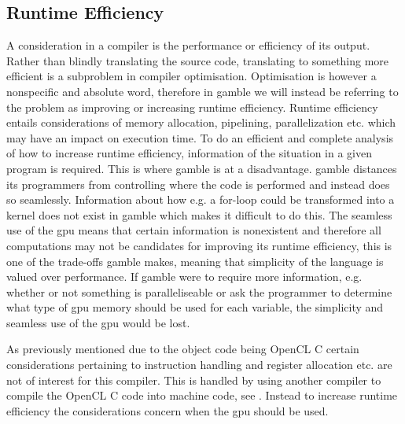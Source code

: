 \subsection*{Runtime Efficiency}\label{subsec:runtime}
A consideration in a compiler is the performance or efficiency of its output. 
Rather than blindly translating the source code, translating to something more efficient is a subproblem in compiler optimisation.
Optimisation is however a nonspecific and absolute word, therefore in \gls{gamble} we will instead be referring to the problem as improving or increasing runtime efficiency.
Runtime efficiency entails considerations of memory allocation, pipelining, parallelization etc. which may have an impact on execution time.
To do an efficient and complete analysis of how to increase runtime efficiency, information of the situation in a given program is required.
This is where \gls{gamble} is at a disadvantage. 
\gls{gamble} distances its programmers from controlling where the code is performed and instead does so seamlessly.
Information about how e.g. a for-loop could be transformed into a kernel does not exist in \gls{gamble} which makes it difficult to do this.
The seamless use of the \acrshort{gpu} means that certain information is nonexistent and therefore all computations may not be candidates for improving its runtime efficiency, this is one of the trade-offs \gls{gamble} makes, meaning that simplicity of the language is valued over performance.
If \gls{gamble} were to require more information, e.g. whether or not something is paralleliseable or ask the programmer to determine what type of \acrshort{gpu} memory should be used for each variable, the simplicity and seamless use of the \acrshort{gpu} would be lost.

As previously mentioned due to the object code being OpenCL C certain considerations pertaining to instruction handling and register allocation etc. are not of interest for this compiler.
This is handled by using another compiler to compile the OpenCL C code into machine code, see . 
Instead to increase runtime efficiency the considerations concern when the \acrshort{gpu} should be used.


